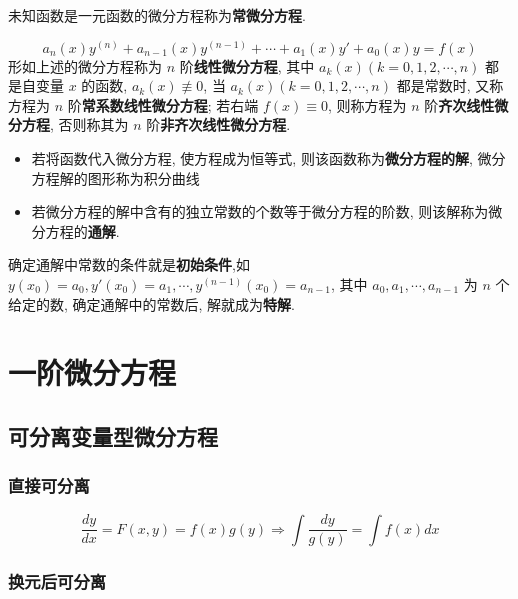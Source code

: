 \begin{definition}[常微分方程]
	未知函数是一元函数的微分方程称为\textbf{常微分方程}.
\end{definition}

\begin{definition}[线性微分方程]
	$$a_{n}(x)y^{(n)} + a_{n-1}(x)y^{(n-1)} + \cdots + a_{1}(x)y' + a_{0}(x) y = f(x)$$
	形如上述的微分方程称为 $n$ 阶\textbf{线性微分方程}, 其中 $a_{k}(x)(k=0,1,2,\cdots,n)$ 都是自变量 $x$ 的函数, $a_{k}(x)\not\equiv 0$, 当 $a_{k}(x)(k=0,1,2,\cdots,n)$ 都是常数时,
	又称方程为 $n$ 阶\textbf{常系数线性微分方程}; 若右端 $f(x)\equiv 0$, 则称方程为 $n$ 阶\textbf{齐次线性微分方程}, 否则称其为 $n$ 阶\textbf{非齐次线性微分方程}.
\end{definition}
\begin{definition}[微分方程的解和通解]
	\begin{itemize}
		\item 若将函数代入微分方程, 使方程成为恒等式, 则该函数称为\textbf{微分方程的解}, 微分方程解的图形称为积分曲线
		\item 若微分方程的解中含有的独立常数的个数等于微分方程的阶数, 则该解称为微分方程的\textbf{通解}.
	\end{itemize}
\end{definition}
\begin{definition}[初始条件和特解]
	确定通解中常数的条件就是\textbf{初始条件},如 $y(x_{0})=a_{0},y'(x_{0})=a_{1},\cdots,y^{(n-1)}(x_{0})=a_{n-1}$,
	其中 $a_{0},a_{1},\cdots,a_{n-1}$ 为 $n$ 个给定的数, 确定通解中的常数后, 解就成为\textbf{特解}.
\end{definition}
\section{一阶微分方程}

\subsection{可分离变量型微分方程}\label{def: 分离变量型一阶微分方程}
\subsubsection{直接可分离}
$$\dfrac{dy}{dx} = F(x,y)=f(x)g(y)\Rightarrow \int \dfrac{dy}{g(y)} = \int f(x)dx$$
\subsubsection{换元后可分离}

